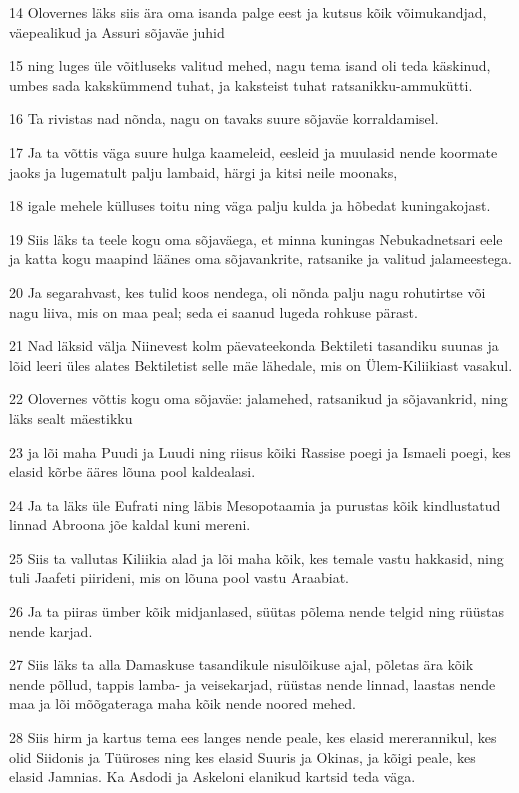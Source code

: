 \par 14 Olovernes läks siis ära oma isanda palge eest ja kutsus kõik võimukandjad, väepealikud ja Assuri sõjaväe juhid
\par 15 ning luges üle võitluseks valitud mehed, nagu tema isand oli teda käskinud, umbes sada kakskümmend tuhat, ja kaksteist tuhat ratsanikku-ammukütti.
\par 16 Ta rivistas nad nõnda, nagu on tavaks suure sõjaväe korraldamisel.
\par 17 Ja ta võttis väga suure hulga kaameleid, eesleid ja muulasid nende koormate jaoks ja lugematult palju lambaid, härgi ja kitsi neile moonaks,
\par 18 igale mehele külluses toitu ning väga palju kulda ja hõbedat kuningakojast.
\par 19 Siis läks ta teele kogu oma sõjaväega, et minna kuningas Nebukadnetsari eele ja katta kogu maapind läänes oma sõjavankrite, ratsanike ja valitud jalameestega.
\par 20 Ja segarahvast, kes tulid koos nendega, oli nõnda palju nagu rohutirtse või nagu liiva, mis on maa peal; seda ei saanud lugeda rohkuse pärast.
\par 21 Nad läksid välja Niinevest kolm päevateekonda Bektileti tasandiku suunas ja lõid leeri üles alates Bektiletist selle mäe lähedale, mis on Ülem-Kiliikiast vasakul.
\par 22 Olovernes võttis kogu oma sõjaväe: jalamehed, ratsanikud ja sõjavankrid, ning läks sealt mäestikku
\par 23 ja lõi maha Puudi ja Luudi ning riisus kõiki Rassise poegi ja Ismaeli poegi, kes elasid kõrbe ääres lõuna pool kaldealasi.
\par 24 Ja ta läks üle Eufrati ning läbis Mesopotaamia ja purustas kõik kindlustatud linnad Abroona jõe kaldal kuni mereni.
\par 25 Siis ta vallutas Kiliikia alad ja lõi maha kõik, kes temale vastu hakkasid, ning tuli Jaafeti piirideni, mis on lõuna pool vastu Araabiat.
\par 26 Ja ta piiras ümber kõik midjanlased, süütas põlema nende telgid ning rüüstas nende karjad.
\par 27 Siis läks ta alla Damaskuse tasandikule nisulõikuse ajal, põletas ära kõik nende põllud, tappis lamba- ja veisekarjad, rüüstas nende linnad, laastas nende maa ja lõi mõõgateraga maha kõik nende noored mehed.
\par 28 Siis hirm ja kartus tema ees langes nende peale, kes elasid mererannikul, kes olid Siidonis ja Tüüroses ning kes elasid Suuris ja Okinas, ja kõigi peale, kes elasid Jamnias. Ka Asdodi ja Askeloni elanikud kartsid teda väga.


